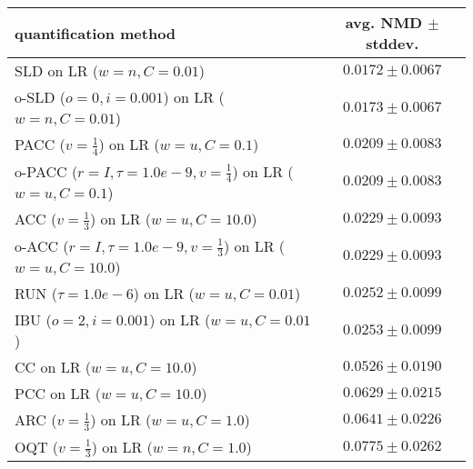 \begin{tabular}{lc}
  \toprule
  quantification method & avg. NMD $\pm$ stddev. \\
  \midrule
  SLD on LR ($w=n, C=0.01$) & $\mathbf{0.0172 \pm 0.0067}$ \\
  o-SLD ($o=0, i=0.001$) on LR ($w=n, C=0.01$) & $0.0173 \pm 0.0067$ \\
  PACC ($v=\frac{1}{4}$) on LR ($w=u, C=0.1$) & $0.0209 \pm 0.0083$ \\
  o-PACC ($r=I, \tau=1.0e-9, v=\frac{1}{4}$) on LR ($w=u, C=0.1$) & $0.0209 \pm 0.0083$ \\
  ACC ($v=\frac{1}{3}$) on LR ($w=u, C=10.0$) & $0.0229 \pm 0.0093$ \\
  o-ACC ($r=I, \tau=1.0e-9, v=\frac{1}{3}$) on LR ($w=u, C=10.0$) & $0.0229 \pm 0.0093$ \\
  RUN ($\tau=1.0e-6$) on LR ($w=u, C=0.01$) & $0.0252 \pm 0.0099$ \\
  IBU ($o=2, i=0.001$) on LR ($w=u, C=0.01$) & $0.0253 \pm 0.0099$ \\
  CC on LR ($w=u, C=10.0$) & $0.0526 \pm 0.0190$ \\
  PCC on LR ($w=u, C=10.0$) & $0.0629 \pm 0.0215$ \\
  ARC ($v=\frac{1}{3}$) on LR ($w=u, C=1.0$) & $0.0641 \pm 0.0226$ \\
  OQT ($v=\frac{1}{3}$) on LR ($w=n, C=1.0$) & $0.0775 \pm 0.0262$ \\
  \bottomrule
\end{tabular}
